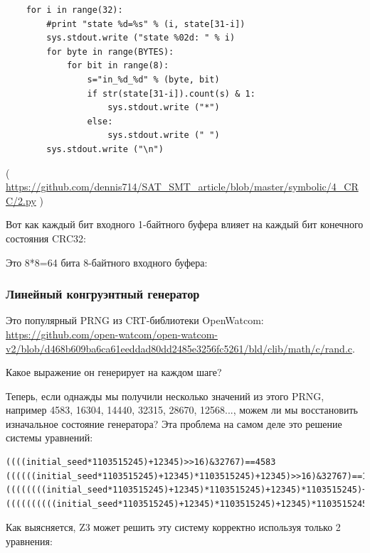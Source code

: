 \begin{lstlisting}
    for i in range(32):
        #print "state %d=%s" % (i, state[31-i])
        sys.stdout.write ("state %02d: " % i)
        for byte in range(BYTES):
            for bit in range(8):
                s="in_%d_%d" % (byte, bit)
                if str(state[31-i]).count(s) & 1:
                    sys.stdout.write ("*")
                else:
                    sys.stdout.write (" ")
        sys.stdout.write ("\n")
\end{lstlisting}

( \url{https://github.com/dennis714/SAT_SMT_article/blob/master/symbolic/4_CRC/2.py} )

Вот как каждый бит входного 1-байтного буфера влияет на каждый бит конечного состояния CRC32:



Это 8*8=64 бита 8-байтного входного буфера:



\subsubsection{Линейный конгруэнтный генератор}

Это популярный \ac{PRNG} из \ac{CRT}-библиотеки OpenWatcom: \url{https://github.com/open-watcom/open-watcom-v2/blob/d468b609ba6ca61eeddad80dd2485e3256fc5261/bld/clib/math/c/rand.c}.

Какое выражение он генерирует на каждом шаге?





Теперь, если однажды мы получили несколько значений из этого PRNG, например 4583, 16304, 14440, 32315, 28670, 12568...,
можем ли мы восстановить изначальное состояние генератора?
Эта проблема на самом деле это решение системы уравнений:

\begin{lstlisting}
((((initial_seed*1103515245)+12345)>>16)&32767)==4583
((((((initial_seed*1103515245)+12345)*1103515245)+12345)>>16)&32767)==16304
((((((((initial_seed*1103515245)+12345)*1103515245)+12345)*1103515245)+12345)>>16)&32767)==14440
((((((((((initial_seed*1103515245)+12345)*1103515245)+12345)*1103515245)+12345)*1103515245)+12345)>>16)&32767)==32315
\end{lstlisting}

Как выясняется, Z3 может решить эту систему корректно используя только 2 уравнения:


